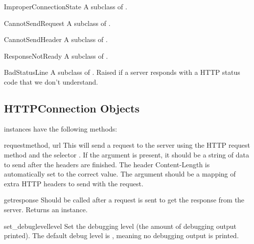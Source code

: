 \begin{excdesc}{ImproperConnectionState}
A subclass of .
\end{excdesc}

\begin{excdesc}{CannotSendRequest}
A subclass of .
\end{excdesc}

\begin{excdesc}{CannotSendHeader}
A subclass of .
\end{excdesc}

\begin{excdesc}{ResponseNotReady}
A subclass of .
\end{excdesc}

\begin{excdesc}{BadStatusLine}
A subclass of .  Raised if a server responds with a
HTTP status code that we don't understand.
\end{excdesc}


\subsection{HTTPConnection Objects \label{httpconnection-objects}}

 instances have the following methods:

\begin{methoddesc}{request}{method, url}
This will send a request to the server using the HTTP request method
 and the selector .  If the  argument is
present, it should be a string of data to send after the headers are finished.
The header Content-Length is automatically set to the correct value.
The  argument should be a mapping of extra HTTP headers to send
with the request.
\end{methoddesc}

\begin{methoddesc}{getresponse}{}
Should be called after a request is sent to get the response from the server.
Returns an  instance.
\end{methoddesc}

\begin{methoddesc}{set_debuglevel}{level}
Set the debugging level (the amount of debugging output printed).
The default debug level is , meaning no debugging output is
printed.
\end{methoddesc}

